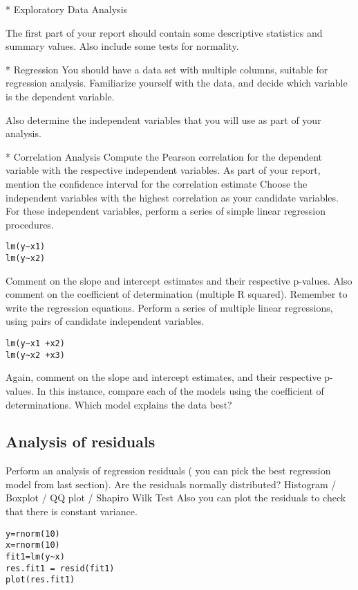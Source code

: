 \begin{itemize}
*  Exploratory Data Analysis

The first part of your report should contain some descriptive statistics and summary values. Also include some tests for normality.

* {Regression}
You should have a data set with multiple columns, suitable for regression analysis.
Familiarize yourself with the data, and decide which variable is the dependent variable.

Also determine the independent variables that you will use as part of your analysis.

* {Correlation Analysis}
Compute the Pearson correlation for the dependent variable with the respective independent variables.  As part of your report, mention the confidence interval for the correlation estimate
Choose the independent variables with the highest correlation as your candidate variables.
For these independent variables, perform a series of simple linear regression procedures.
\begin{verbatim}
lm(y~x1)
lm(y~x2)
\end{verbatim}
Comment on the slope and intercept estimates and their respective p-values. Also comment on the coefficient of determination (multiple R squared). Remember to write the regression equations.
Perform a series of multiple linear regressions, using pairs of candidate independent variables.
\begin{verbatim}
lm(y~x1 +x2)
lm(y~x2 +x3)
\end{verbatim}
Again, comment on the slope and intercept estimates, and their respective p-values.
In this instance, compare each of the models using the coefficient of determinations. Which model explains the data best?
\subsection{Analysis of residuals}
Perform an analysis of regression residuals ( you can pick the best regression model from last section).
Are the residuals normally distributed?
Histogram /  Boxplot / QQ plot / Shapiro Wilk Test
Also you can plot the residuals to check that there is constant variance.
\begin{verbatim}
y=rnorm(10)
x=rnorm(10)
fit1=lm(y~x)
res.fit1 = resid(fit1)
plot(res.fit1)
\end{verbatim}




\newpage

\end{itemize}
